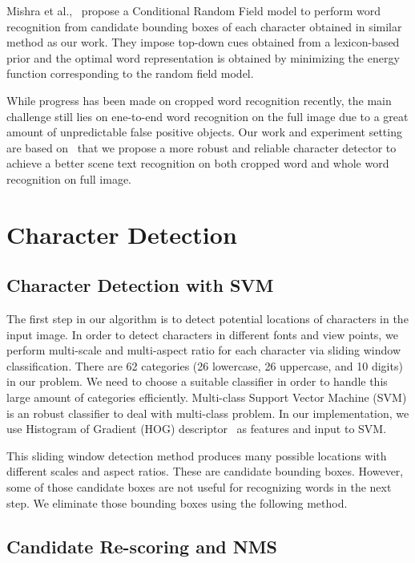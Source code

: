 \documentclass[10pt,twocolumn,letterpaper]{article}
\begin{document}
Mishra et al.,~\cite{111} propose a Conditional Random Field model to perform word recognition from candidate bounding boxes of each character obtained in similar method as our work. They impose top-down cues obtained from a lexicon-based prior and the optimal word representation is obtained by minimizing the energy function corresponding to the random field model.

While progress has been made on cropped word recognition recently, the main challenge still lies on ene-to-end word recognition on the full image due to a great amount of unpredictable false positive objects. Our work and experiment setting are based on~\cite{417} that we propose a more robust and reliable character detector to achieve a better scene text recognition on both cropped word and whole word recognition on full image.

\section{Character Detection}

\subsection{Character Detection with SVM}

The first step in our algorithm is to detect potential locations of characters in the input image. In order to detect characters in different fonts and view points, we perform multi-scale and multi-aspect ratio for each character via sliding window classification. There are 62 categories (26 lowercase, 26 uppercase, and 10 digits) in our problem. We need to choose a suitable classifier in order to handle this large amount of categories efficiently. Multi-class Support Vector Machine (SVM) is an robust classifier to deal with multi-class problem. In our implementation, we use Histogram of Gradient (HOG) descriptor~\cite{115} as features and input to SVM.

This sliding window detection method produces many possible locations with different scales and aspect ratios. These are candidate bounding boxes. However, some of those candidate boxes are not useful for recognizing words in the next step. We eliminate those bounding boxes using the following method.

\subsection{Candidate Re-scoring and NMS}
\end{document}
